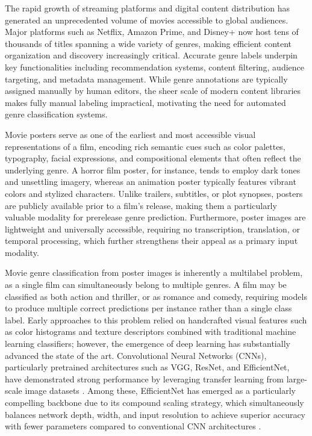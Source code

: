 \documentclass[conference]{IEEEtran}
\begin{document}
The rapid growth of streaming platforms and digital content distribution 
has generated an unprecedented volume of movies accessible to global 
audiences. Major platforms such as Netflix, Amazon Prime, and Disney+ 
now host tens of thousands of titles spanning a wide variety of genres, 
making efficient content organization and discovery increasingly critical. 
Accurate genre labels underpin key functionalities including recommendation 
systems, content filtering, audience targeting, and metadata management. 
While genre annotations are typically assigned manually by human editors, 
the sheer scale of modern content libraries makes fully manual labeling 
impractical, motivating the need for automated genre classification 
systems.

Movie posters serve as one of the earliest and most accessible visual 
representations of a film, encoding rich semantic cues such as color 
palettes, typography, facial expressions, and compositional elements that 
often reflect the underlying genre. A horror film poster, for instance, 
tends to employ dark tones and unsettling imagery, whereas an animation 
poster typically features vibrant colors and stylized characters. Unlike 
trailers, subtitles, or plot synopses, posters are publicly available 
prior to a film's release, making them a particularly valuable modality 
for prerelease genre prediction. Furthermore, poster images are 
lightweight and universally accessible, requiring no transcription, 
translation, or temporal processing, which further strengthens their 
appeal as a primary input modality.

Movie genre classification from poster images is inherently a multilabel 
problem, as a single film can simultaneously belong to multiple genres. 
A film may be classified as both action and thriller, or as romance and 
comedy, requiring models to produce multiple correct predictions per 
instance rather than a single class label. Early approaches to this 
problem relied on handcrafted visual features such as color histograms 
and texture descriptors combined with traditional machine learning 
classifiers; however, the emergence of deep learning has substantially 
advanced the state of the art. Convolutional Neural Networks (CNNs), 
particularly pretrained architectures such as VGG, ResNet, and 
EfficientNet, have demonstrated strong performance by leveraging transfer 
learning from large-scale image datasets \cite{b8,tan2019}. Among 
these, EfficientNet has emerged as a particularly compelling backbone due 
to its compound scaling strategy, which simultaneously balances network 
depth, width, and input resolution to achieve superior accuracy with 
fewer parameters compared to conventional CNN architectures \cite{tan2019}.
\end{document}
